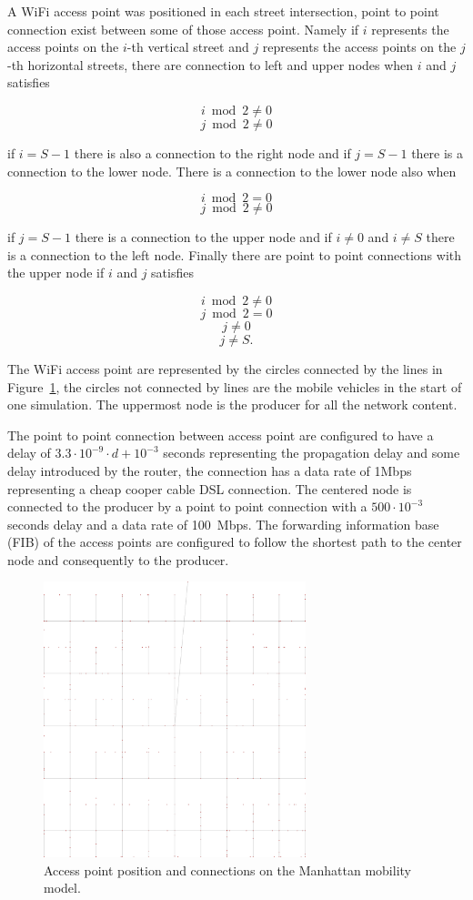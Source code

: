 \documentclass[10pt,a4paper,final]{IEEEtran}
\begin{document}
A WiFi access point was positioned in each street intersection, point to
point connection exist between some of those access point. Namely if $i$
represents the access points on the $i$-th vertical street and $j$ represents
the access points on the $j$-th horizontal streets, there are connection to
left and upper nodes when $i$ and $j$ satisfies

$$i \bmod{2} \ne 0$$
$$j \bmod{2} \ne 0$$

if $i=S-1$ there is also a connection to the right node and if $j=S-1$ there is
a connection to the lower node. There is a connection to the lower node also
when

$$i \bmod{2} = 0$$
$$j \bmod{2} \ne 0$$

if $j=S-1$ there is a connection to the upper node and if $i \ne 0$ and
$i \ne S$ there is a connection to the left node. Finally there are point to
point connections with the upper node if $i$ and $j$ satisfies

$$i \bmod{2} \ne 0$$
$$j \bmod{2} = 0$$
$$j \ne 0$$
$$j \ne S.$$

The WiFi access point are represented by the circles connected by the lines in
Figure~\ref{fig:manh}, the circles not connected by lines are the mobile
vehicles in the start of one simulation. The uppermost node is the producer
for all the network content.

The point to point connection between access point are configured to have a
delay of $3.3 \cdot 10^{-9} \cdot d + 10^{-3}$ seconds representing the propagation
delay and some delay introduced by the router, the connection has a data rate
of 1Mbps representing a cheap cooper cable DSL connection. The centered node is
connected to the producer by a point to point connection with a $500 \cdot
10^{-3}$ seconds delay and a data rate of 100~Mbps.  The forwarding information
base (FIB) of the access points are configured to follow the shortest path to
the center node and consequently to the producer.

\begin{figure}
\centering
\includegraphics[width=3in]{manh2}
\caption{Access point position and connections on the Manhattan mobility
model.}\label{fig:manh}
\end{figure}
\end{document}
